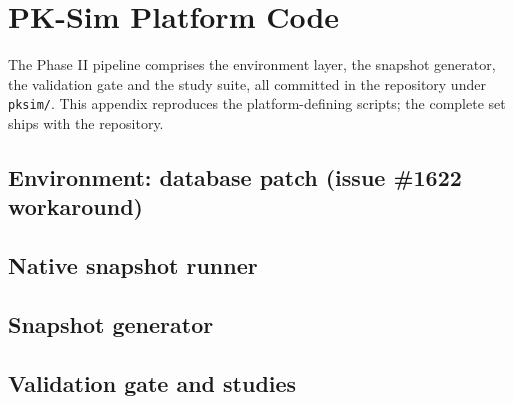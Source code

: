 \chapter{PK-Sim Platform Code}
\label{chap:app-pksim-code}

The Phase II pipeline comprises the environment layer, the snapshot generator, the validation gate and the study suite, all committed in the repository under \texttt{pksim/}. This appendix reproduces the platform-defining scripts; the complete set ships with the repository.

\section{Environment: database patch (issue \#1622 workaround)}


\section{Native snapshot runner}


\section{Snapshot generator}


\section{Validation gate and studies}



